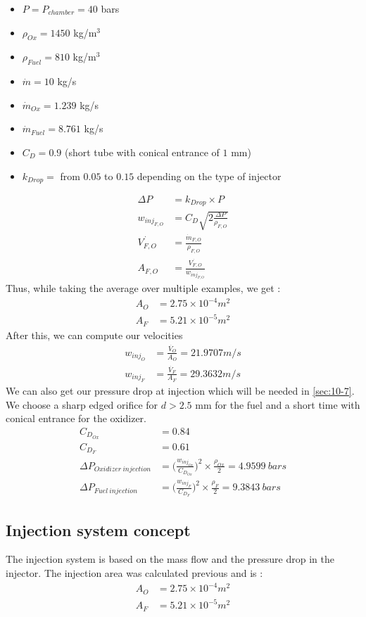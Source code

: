 \begin{itemize}
	\itemsep0em 
	\item $ P = P_{chamber} = 40$ bars
	\item $\rho_{Ox} = 1450$ kg/m$^3$
	\item $\rho_{Fuel} = 810$ kg/m$^3$
	\item $\dot{m} = 10$ kg/s
	\item $\dot{m}_{Ox} = 1.239$ kg/s
	\item $\dot{m}_{Fuel} = 8.761$ kg/s
	\item $C_D = 0.9$ (short tube with conical entrance of $1$ mm)
	\item $k_{Drop} = $ from $0.05$ to $0.15$ depending on the type of injector
\end{itemize}
\begin{align}
\Delta P &= k_{Drop}\times P\\
w_{inj_{F,O}} &= C_D \sqrt{2\frac{\Delta P}{\rho_{F,O}}} \\
\dot{V_{F,O}} &= \frac{\dot{m}_{F, O}}{\rho_{F,O}}\\
A_{F, O} &= \frac{\dot{V_{F,O}}}{w_{inj_{F,O}}}
\end{align}
Thus, while taking the average over multiple examples, we get :
\begin{align}
A_O & = 2.75\times 10^{-4} m^2\\
A_{F} &= 5.21\times 10^{-5} m^2
\end{align}
After this, we can compute our velocities
\begin{align}
w_{inj_{O}} &= \frac{\dot{V_O}}{A_O} = 21.9707 m/s\\
w_{inj_{F}} &= \frac{\dot{V_F}}{A_F} = 29.3632 m/s
\end{align} 
We can also get our pressure drop at injection which will be needed in \autoref{sec:10-7}. We choose a sharp edged orifice for $d>2.5$ mm for the fuel and a short time with conical entrance for the oxidizer.
\begin{align}
C_{D_{Ox}} &= 0.84\\
C_{D_F} &= 0.61\\
\Delta P_{Oxidizer\ injection} &= \bigg(\frac{w_{inj_{Ox}}}{C_{D_{Ox}}}\bigg)^2 \times \frac{\rho_{Ox}}{2} = 4.9599\ bars\\
\Delta P_{Fuel\ injection} &= \bigg(\frac{w_{inj_F}}{C_{D_F}}\bigg)^2 \times \frac{\rho_F}{2} = 9.3843\ bars 
\end{align}

\subsection{Injection system concept}
The injection system is based on the mass flow and the pressure drop in the injector. The injection area was calculated previous and is :
\begin{align}
A_O & = 2.75\times 10^{-4} m^2\\
A_{F} &= 5.21\times 10^{-5} m^2
\end{align}


